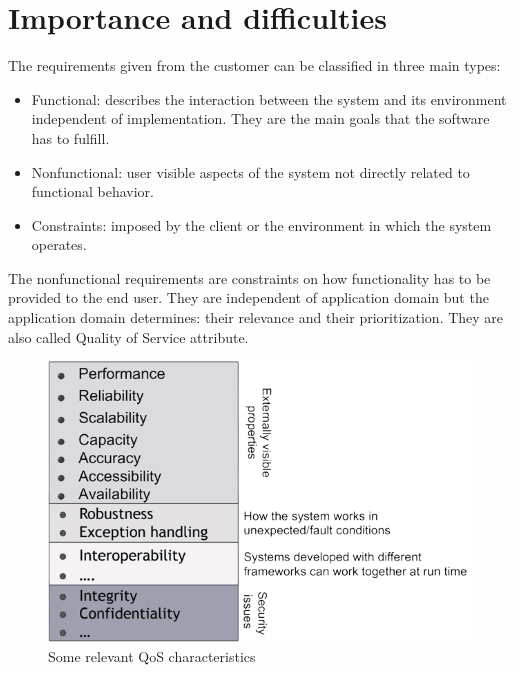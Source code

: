 \documentclass[12pt, a4paper]{report}
\begin{document}
    \section{Importance and difficulties}
    The requirements given from the customer can be classified in three main types:
    \begin{itemize}
        \item Functional: describes the interaction between the system and its environment independent of implementation. They are the main goals that the software has to fulfill.
        \item Nonfunctional: user visible aspects of the system not directly related to functional behavior.
        \item Constraints: imposed by the client or the environment in which the system operates.
    \end{itemize}
    The nonfunctional requirements are constraints on how functionality has to be provided to the end user. They are independent of application domain but the application domain 
    determines: their relevance and their prioritization. They are also called Quality of Service attribute. 
    \begin{figure}[H]
        \centering
        \includegraphics[width=0.75\linewidth]{images/QoS.png}
        \caption{Some relevant QoS characteristics}
    \end{figure}
\end{document}
